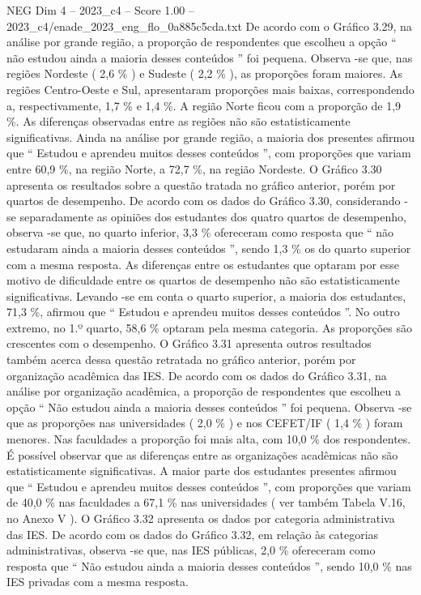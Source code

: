\begin{textsample}{NEG Dim 4 – 2023\_c4 – Score 1.00 – 2023\_c4/enade\_2023\_eng\_flo\_0a885c5cda.txt}
De acordo com o Gráfico 3.29, na análise por grande região, a proporção de respondentes que escolheu a opção “ não estudou ainda a maioria desses conteúdos ” foi pequena.
Observa -se que, nas regiões Nordeste ( 2,6 \% ) e Sudeste ( 2,2 \% ), as proporções foram maiores.
As regiões Centro-Oeste e Sul, apresentaram proporções mais baixas, correspondendo a, respectivamente, 1,7 \% e 1,4 \%.
A região Norte ficou com a proporção de 1,9 \%.
As diferenças observadas entre as regiões não são estatisticamente significativas.
Ainda na análise por grande região, a maioria dos presentes afirmou que “ Estudou e aprendeu muitos desses conteúdos ”, com proporções que variam entre 60,9 \%, na região Norte, a 72,7 \%, na região Nordeste.
O Gráfico 3.30 apresenta os resultados sobre a questão tratada no gráfico anterior, porém por quartos de desempenho.
De acordo com os dados do Gráfico 3.30, considerando -se separadamente as opiniões dos estudantes dos quatro quartos de desempenho, observa -se que, no quarto inferior, 3,3 \% ofereceram como resposta que “ não estudaram ainda a maioria desses conteúdos ”, sendo 1,3 \% os do quarto superior com a mesma resposta.
As diferenças entre os estudantes que optaram por esse motivo de dificuldade entre os quartos de desempenho não são estatisticamente significativas.
Levando -se em conta o quarto superior, a maioria dos estudantes, 71,3 \%, afirmou que “ Estudou e aprendeu muitos desses conteúdos ”.
No outro extremo, no 1.º quarto, 58,6 \% optaram pela mesma categoria.
As proporções são crescentes com o desempenho.
O Gráfico 3.31 apresenta outros resultados também acerca dessa questão retratada no gráfico anterior, porém por organização acadêmica das IES.
De acordo com os dados do Gráfico 3.31, na análise por organização acadêmica, a proporção de respondentes que escolheu a opção “ Não estudou ainda a maioria desses conteúdos ” foi pequena.
Observa -se que as proporções nas universidades ( 2,0 \% ) e nos CEFET/IF ( 1,4 \% ) foram menores.
Nas faculdades a proporção foi mais alta, com 10,0 \% dos respondentes.
É possível observar que as diferenças entre as organizações acadêmicas não são estatisticamente significativas.
A maior parte dos estudantes presentes afirmou que “ Estudou e aprendeu muitos desses conteúdos ”, com proporções que variam de 40,0 \% nas faculdades a 67,1 \% nas universidades ( ver também Tabela V.16, no Anexo V ).
O Gráfico 3.32 apresenta os dados por categoria administrativa das IES.
De acordo com os dados do Gráfico 3.32, em relação às categorias administrativas, observa -se que, nas IES públicas, 2,0 \% ofereceram como resposta que “ Não estudou ainda a maioria desses conteúdos ”, sendo 10,0 \% nas IES privadas com a mesma resposta.

\end{textsample}
